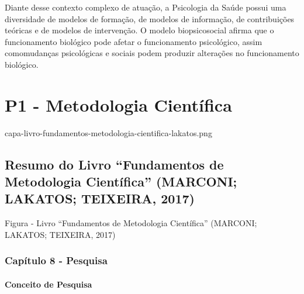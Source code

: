 \documentclass[
]{book}
\begin{document}
Diante desse contexto complexo de atuação, a Psicologia da Saúde possui uma diversidade de modelos de formação, de modelos de informação, de contribuições teóricas e de modelos de intervenção. O modelo biopsicosocial afirma que o funcionamento biológico pode afetar o funcionamento psicológico, assim comomudanças psicológicas e sociais podem produzir alterações no funcionamento biológico.

\hypertarget{p1---metodologia-cientuxedfica}{%
\chapter{P1 - Metodologia Científica}\label{p1---metodologia-cientuxedfica}}

capa-livro-fundamentos-metodologia-cientifica-lakatos.png

\hypertarget{resumo-do-livro-fundamentos-de-metodologia-cientuxedfica-marconi-lakatos-teixeira-2017}{%
\section{\texorpdfstring{Resumo do Livro ``\textbf{Fundamentos de Metodologia Científica}'' (MARCONI; LAKATOS; TEIXEIRA, 2017)}{Resumo do Livro ``Fundamentos de Metodologia Científica'' (MARCONI; LAKATOS; TEIXEIRA, 2017)}}\label{resumo-do-livro-fundamentos-de-metodologia-cientuxedfica-marconi-lakatos-teixeira-2017}}

Figura - Livro ``Fundamentos de Metodologia Científica'' (MARCONI; LAKATOS; TEIXEIRA, 2017)

\hypertarget{capuxedtulo-8---pesquisa}{%
\subsection{Capítulo 8 - Pesquisa}\label{capuxedtulo-8---pesquisa}}

\hypertarget{conceito-de-pesquisa}{%
\subsubsection{Conceito de Pesquisa}\label{conceito-de-pesquisa}}
\end{document}
